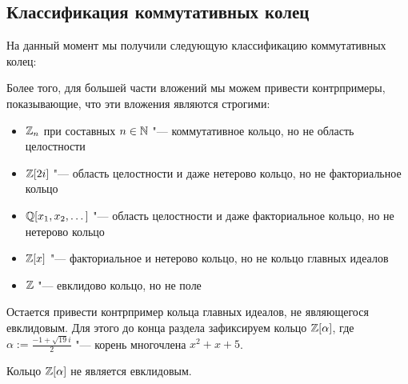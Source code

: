 \subsection{Классификация коммутативных колец}

На данный момент мы получили следующую классификацию коммутативных колец:
\begin{center}\end{center}

Более того, для большей части вложений мы можем привести контрпримеры, показывающие, что эти вложения являются строгими:
\begin{itemize}
	\item $\mathbb{Z}_n$ при составных $n \in \mathbb{N}$ "--- коммутативное кольцо, но не область целостности
	\item $\mathbb{Z}[2i]$ "--- область целостности и даже нетерово кольцо, но не факториальное кольцо
	\item $\mathbb{Q}[x_1, x_2, \dotsc]$ "--- область целостности и даже факториальное кольцо, но не нетерово кольцо
	\item $\mathbb{Z}[x]$ "--- факториальное и нетерово кольцо, но не кольцо главных идеалов
	\item $\mathbb{Z}$ "--- евклидово кольцо, но не поле
\end{itemize}

Остается привести контрпример кольца главных идеалов, не являющегося евклидовым. Для этого до конца раздела зафиксируем кольцо $\mathbb{Z}[\alpha]$, где $\alpha := \frac{-1 + \sqrt{19}i}2$ "--- корень многочлена $x^2 + x + 5$.

\begin{theorem}
	Кольцо $\mathbb{Z}[\alpha]$ не является евклидовым.
\end{theorem}

